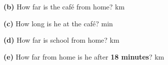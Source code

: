\documentclass[12pt,a4paper]{article}
\newif\iffr
\newcommand{\fr}[1]{\unskip\iffr\par\vspace{1pt}\noindent{\small\itshape\color{black!60}#1}\par\fi}
\newcommand{\frl}[2]{\iffr#2\else#1\fi}
\begin{document}
\begin{minipage}{\textwidth}
\begin{minipage}[t]{0.50\textwidth}
\vspace{\frl{5pt}{8pt}}
\textbf{(b)} How far is the caf\'e from home? \hfill\mbox{\blank[1.3cm] km}
\fr{(b) \`A quelle distance de chez lui se trouve le caf\'e~?}

\vspace{\frl{5pt}{8pt}}
\textbf{(c)} How long is he at the caf\'e? \hfill\mbox{\blank[1.3cm] min}
\fr{(c) Combien de temps reste-t-il au caf\'e~?}

\vspace{\frl{5pt}{8pt}}
\textbf{(d)} How far is school from home? \hfill\mbox{\blank[1.3cm] km}
\fr{(d) \`A quelle distance de chez lui se trouve l'\'ecole~?}

\vspace{\frl{5pt}{8pt}}
\textbf{(e)} How far from home is he after \textbf{18 minutes}? \hfill\mbox{\blank[1.3cm] km}
\fr{(e) \`A quelle distance de chez lui est-il au bout de 18 minutes~?}
\end{minipage}
\end{minipage}

\end{document}
